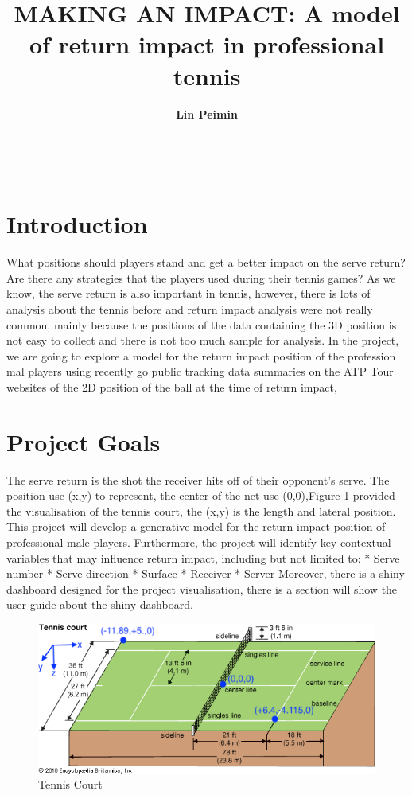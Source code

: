 \documentclass[11pt,a4paper,]{article}
\title{MAKING AN IMPACT: A model of return impact in professional tennis}
\author{\sf\Large\textbf{ Lin Peimin}\\ {\sf\large \\[0.5cm]}}
\date{\sf\Date~\Month~\Year}
\makeatletter
\def\titlepage{\front{\expandafter{\@title}}{\@author}{\@organization}}
\makeatother
\begin{document}
\titlepage

\clearpage

\hypertarget{introduction}{%
\section{Introduction}\label{introduction}}

What positions should players stand and get a better impact on the serve return? Are there any strategies that the players used during their tennis games? As we know, the serve return is also important in tennis, however, there is lots of analysis about the tennis before and return impact analysis were not really common, mainly because the positions of the data containing the 3D position is not easy to collect and there is not too much sample for analysis. In the project, we are going to explore a model for the return impact position of the profession mal players using recently go public tracking data summaries on the ATP Tour websites of the 2D position of the ball at the time of return impact,

\hypertarget{project-goals}{%
\section{Project Goals}\label{project-goals}}

The serve return is the shot the receiver hits off of their opponent's serve. The position use (x,y) to represent, the center of the net use (0,0),Figure \ref{fig:court} provided the visualisation of the tennis court, the (x,y) is the length and lateral position. This project will develop a generative model for the return impact position of professional male players. Furthermore, the project will identify key contextual variables that may influence return impact, including but not limited to:
* Serve number
* Serve direction
* Surface
* Receiver
* Server
Moreover, there is a shiny dashboard designed for the project visualisation, there is a section will show the user guide about the shiny dashboard.

\begin{figure}
\includegraphics[width=0.7\linewidth]{image/tennis_court} \caption{Tennis Court}\label{fig:court}
\end{figure}
\end{document}
